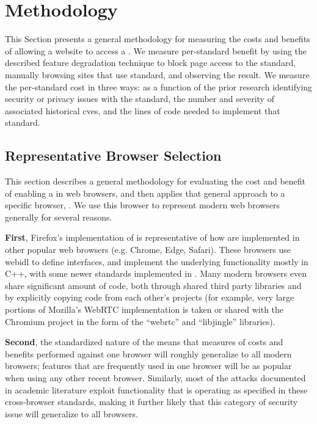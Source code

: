 \section{Methodology}
\label{cost-benefit:methodology}

This Section presents a general methodology for measuring the costs and
benefits of allowing a website to access a \WAS.  We measure per-standard
benefit by using the described feature degradation technique to block page
access to the standard, manually browsing sites that use standard, and
observing the result.  We measure the per-standard cost in three ways: as a
function of the prior research identifying security or privacy issues with the
standard, the number and severity of associated historical \gls{cve}s, and the
lines of code needed to implement that standard.


\subsection{Representative Browser Selection}
\label{cost-benefit:methodology:methodology-browser}
This section describes a general methodology for evaluating the cost and
benefit of enabling a \WAS in web browsers, and then applies that
general approach to a specific browser, \textbf{\FFWithVersion}.  We use
this browser to represent modern web browsers generally for several reasons.

\textbf{First}, Firefox's implementation of \WASs is representative of how
\WASs are implemented in other popular web browsers (e.g. Chrome, Edge,
Safari).  These browsers use \gls{webidl} to define \WAPI interfaces, and
implement the underlying functionality mostly in C++, with some newer standards
implemented in \JS.  Many modern browsers even share significant amount of
code, both through shared third party libraries and by explicitly copying code
from each other's projects (for example, very large portions of Mozilla's
WebRTC implementation is taken or shared with the Chromium project in the form
of the ``webrtc'' and ``libjingle'' libraries).

\textbf{Second}, the standardized nature of the \WAPI means that measures of
\WAPI costs and benefits performed against one browser will roughly generalize
to all modern browsers; features that are frequently used in one browser will
be as popular when using any other recent browser.  Similarly, most of the
attacks documented in academic literature exploit functionality that is
operating as specified in these cross-browser standards, making it further
likely that this category of security issue will generalize to all browsers.

